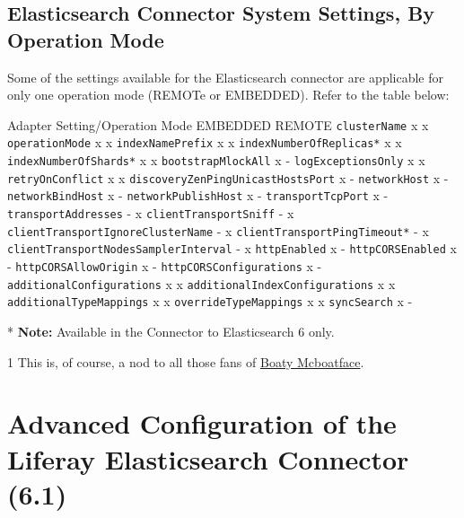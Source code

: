 \subsection{Elasticsearch Connector System Settings, By Operation
Mode}\label{elasticsearch-connector-system-settings-by-operation-mode-1}

Some of the settings available for the Elasticsearch connector are
applicable for only one operation mode (REMOTe or EMBEDDED). Refer to
the table below:

Adapter Setting/Operation Mode \textbar{} EMBEDDED \textbar{} REMOTE
\textbar{} \texttt{clusterName} \textbar{} x \textbar{} x
\texttt{operationMode} \textbar{} x \textbar{} x
\texttt{indexNamePrefix} \textbar{} x \textbar{} x
\texttt{indexNumberOfReplicas*} \textbar{} x \textbar{} x
\texttt{indexNumberOfShards*} \textbar{} x \textbar{} x
\texttt{bootstrapMlockAll} \textbar{} x \textbar{} -
\texttt{logExceptionsOnly} \textbar{} x \textbar{} x
\texttt{retryOnConflict} \textbar{} x \textbar{} x
\texttt{discoveryZenPingUnicastHostsPort} \textbar{} x \textbar{} -
\texttt{networkHost} \textbar{} x \textbar{} - \texttt{networkBindHost}
\textbar{} x \textbar{} - \texttt{networkPublishHost} \textbar{} x
\textbar{} - \texttt{transportTcpPort} \textbar{} x \textbar{} -
\texttt{transportAddresses} \textbar{} - \textbar{} x
\texttt{clientTransportSniff} \textbar{} - \textbar{} x
\texttt{clientTransportIgnoreClusterName} \textbar{} - \textbar{} x
\texttt{clientTransportPingTimeout*} \textbar{} - \textbar{} x
\texttt{clientTransportNodesSamplerInterval} \textbar{} - \textbar{} x
\texttt{httpEnabled} \textbar{} x \textbar{} - \texttt{httpCORSEnabled}
\textbar{} x \textbar{} - \texttt{httpCORSAllowOrigin} \textbar{} x
\textbar{} - \texttt{httpCORSConfigurations} \textbar{} x \textbar{} -
\texttt{additionalConfigurations} \textbar{} x \textbar{} x
\texttt{additionalIndexConfigurations} \textbar{} x \textbar{} x
\texttt{additionalTypeMappings} \textbar{} x \textbar{} x
\texttt{overrideTypeMappings} \textbar{} x \textbar{} x
\texttt{syncSearch} \textbar{} x \textbar{} -

* \textbf{Note:} Available in the Connector to Elasticsearch 6 only.

1 This is, of course, a nod to all those fans of
\href{http://www.theatlantic.com/international/archive/2016/05/boaty-mcboatface-parliament-lessons/482046}{Boaty
Mcboatface}.

\section{Advanced Configuration of the Liferay Elasticsearch Connector
(6.1)}\label{advanced-configuration-of-the-liferay-elasticsearch-connector-6.1}

